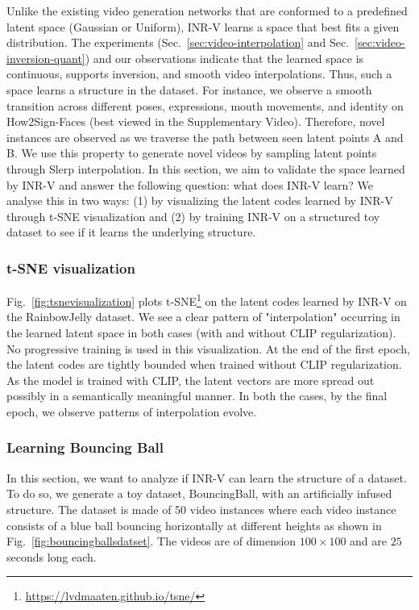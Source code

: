 \documentclass[10pt]{article} \usepackage[accepted]{tmlr}
\begin{document}
Unlike the existing video generation networks that are conformed to a predefined latent space (Gaussian or Uniform), INR-V learns a space that best fits a given distribution. The experiments (Sec.~\ref{sec:video-interpolation} and Sec.~\ref{sec:video-inversion-quant}) and our observations indicate that the learned space is continuous, supports inversion, and smooth video interpolations. Thus, such a space learns a structure in the dataset. For instance, we observe a smooth transition across different poses, expressions, mouth movements, and identity on How2Sign-Faces (best viewed in the Supplementary Video). Therefore, novel instances are observed as we traverse the path between seen latent points A and B. We use this property to generate novel videos by sampling latent points through Slerp interpolation. In this section, we aim to validate the space learned by INR-V and answer the following question: what does INR-V learn? We analyse this in two ways: (1) by visualizing the latent codes learned by INR-V through t-SNE visualization and (2) by training INR-V on a structured toy dataset to see if it learns the underlying structure.

\subsubsection{t-SNE visualization}

Fig.~\ref{fig:tsnevisualization} plots t-SNE\def\thefootnote{$^4$}\footnote{\href{https://lvdmaaten.github.io/tsne/}{https://lvdmaaten.github.io/tsne/}} on the latent codes learned by INR-V on the RainbowJelly dataset. We see a clear pattern of "interpolation" occurring in the learned latent space in both cases (with and without CLIP regularization). No progressive training is used in this visualization. At the end of the first epoch, the latent codes are tightly bounded when trained without CLIP regularization. As the model is trained with CLIP, the latent vectors are more spread out possibly in a semantically meaningful manner. In both the cases, by the final epoch, we observe patterns of interpolation evolve.

\subsubsection{Learning Bouncing Ball}

In this section, we want to analyze if INR-V can learn the structure of a dataset. To do so, we generate a toy dataset, BouncingBall, with an artificially infused structure. The dataset is made of 50 video instances where each video instance consists of a blue ball bouncing horizontally at different heights as shown in Fig.~\ref{fig:bouncingballsdatset}. The videos are of dimension $100 \times 100$ and are $25$ seconds long each.
\end{document}
